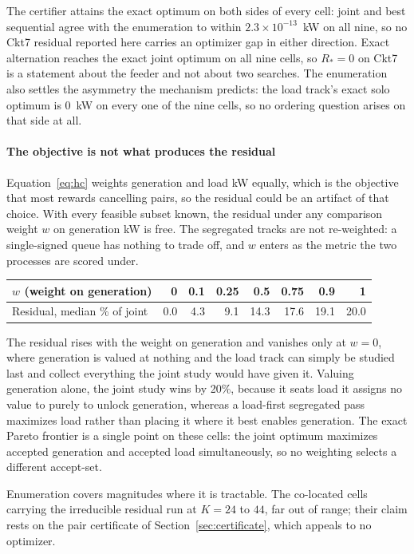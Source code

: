 \documentclass[review,authoryear,12pt]{elsarticle}
\begin{document}
The certifier attains the exact optimum on both sides of every cell: joint
and best sequential agree with the enumeration to within $2.3\times10^{-13}$~kW
on all nine, so no Ckt7 residual reported here carries an optimizer gap in
either direction. Exact alternation reaches the exact joint optimum on all nine
cells, so $R_{\ast} = 0$ on Ckt7 is a statement about the feeder and not about
two searches. The enumeration also settles the asymmetry the mechanism
predicts: the load track's exact solo optimum is $0$~kW on every one of the nine
cells, so no ordering question arises on that side at all.

\paragraph{The objective is not what produces the residual}
Equation~\eqref{eq:hc} weights generation and load kW equally, which is the
objective that most rewards cancelling pairs, so the residual could be an
artifact of that choice. With every feasible subset known, the residual under
any comparison weight $w$ on generation kW is free. The segregated tracks are
not re-weighted: a single-signed queue has nothing to trade off, and $w$ enters
as the metric the two processes are scored under.

\begin{center}
\small
\begin{tabular}{@{}lrrrrrrr@{}}
\toprule
$w$ (weight on generation) & 0 & 0.1 & 0.25 & 0.5 & 0.75 & 0.9 & 1 \\
\midrule
Residual, median \% of joint & 0.0 & 4.3 & 9.1 & 14.3 & 17.6 & 19.1 & 20.0 \\
\bottomrule
\end{tabular}
\end{center}

The residual rises with the weight on generation and vanishes only at $w = 0$,
where generation is valued at nothing and the load track can simply be studied
last and collect everything the joint study would have given it. Valuing
generation alone, the joint study wins by 20\%, because
it seats load it assigns no value to purely to unlock generation, whereas a
load-first segregated pass maximizes load rather than placing it where it best
enables generation. The exact Pareto frontier is a single point on these cells:
the joint optimum maximizes accepted generation and accepted load
simultaneously, so no weighting selects a different accept-set.

Enumeration covers magnitudes where it is tractable. The co-located cells
carrying the irreducible residual run at $K=24$ to $44$, far out of range;
their claim rests on the pair certificate of Section~\ref{sec:certificate},
which appeals to no optimizer.
\end{document}
